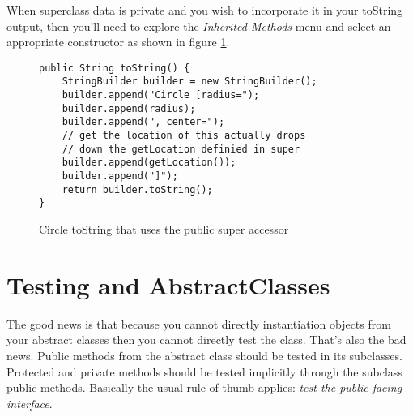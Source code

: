 \documentclass[]{tufte-handout}
\begin{document}
When superclass data is private and you wish to incorporate it in your toString output, then  you'll need to explore the \textit{Inherited Methods} menu and select an appropriate constructor as shown in figure \ref{fig:circtostr}.

\begin{figure}[!ht]
\begin{lstlisting}
public String toString() {
	StringBuilder builder = new StringBuilder();
	builder.append("Circle [radius=");
	builder.append(radius);
	builder.append(", center=");
	// get the location of this actually drops
	// down the getLocation definied in super
	builder.append(getLocation());
	builder.append("]");
	return builder.toString();
}

\end{lstlisting}
\label{fig:circtostr}
\caption{Circle toString that uses the public super accessor}
\end{figure}

\section{Testing and AbstractClasses}

The good news is that because you cannot directly instantiation objects from your abstract classes then you cannot directly test the class. That's also the bad news. Public methods from the abstract class should be tested in its subclasses. Protected and private methods should be tested implicitly through the subclass public methods. Basically the usual rule of thumb applies: \textit{test the public facing interface}. 
\end{document}
